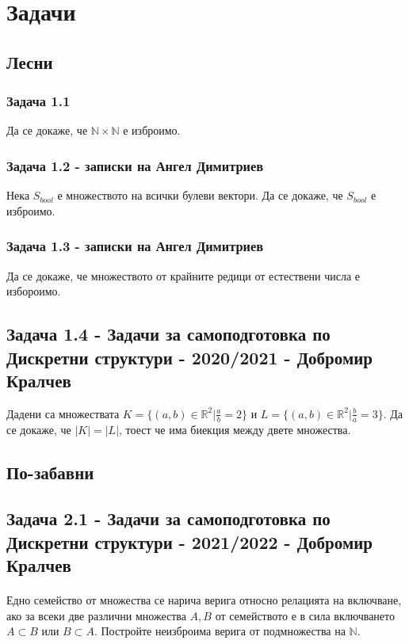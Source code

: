 \documentclass[12pt]{article}
\begin{document}
\section*{Задачи}

\subsection*{Лесни}
\subsubsection*{Задача 1.1}
Да се докаже, че $\mathbb{N} \times \mathbb{N}$ е изброимо.
\subsubsection*{Задача 1.2 - записки на Ангел Димитриев}
Нека $S_{bool}$ е множеството на всички булеви вектори. Да се докаже, че $S_{bool}$ е изброимо.
\subsubsection*{Задача 1.3 - записки на Ангел Димитриев}
Да се докаже, че множеството от крайните редици от естествени числа е избороимо.
\subsection*{Задача 1.4 - Задачи за самоподготовка по Дискретни структури - 2020/2021 - Добромир Кралчев}
Дадени са множествата $K = \{ (a, b) \in \mathbb{R}^2 | \frac{a}{b} = 2 \}$ и $L = \{ (a, b) \in \mathbb{R}^2 | \frac{b}{a} = 3 \}$. Да се докаже, че $|K| = |L|$, тоест че има биекция между двете множества.

\subsection*{По-забавни}
\subsection*{Задача 2.1 - Задачи за самоподготовка по Дискретни структури - 2021/2022 - Добромир Кралчев}
\paragraph*{}
Едно семейство от множества се нарича верига относно релацията на включване, ако за всеки две различни множества $A, B$ от семейството е в сила включването $A \subset B$ или $B \subset A$. Постройте неизброима верига от подмножества на $\mathbb{N}$.
\end{document}
